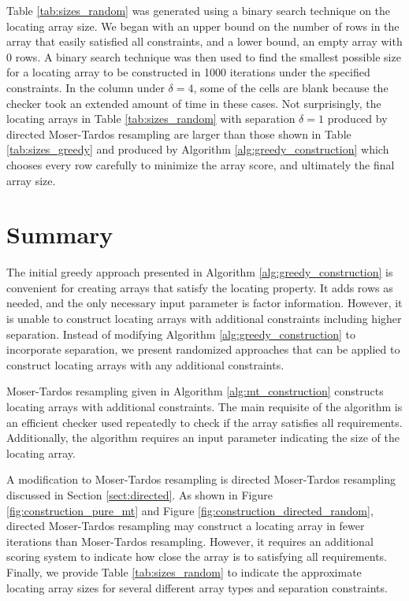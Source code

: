 Table \ref{tab:sizes_random} was generated using a binary search technique on the locating array size.
We began with an upper bound on the number of rows in the array that easily satisfied all constraints, and a lower bound, an empty array with 0 rows.
A binary search technique was then used to find the smallest possible size for a locating array to be constructed in 1000 iterations under the specified constraints.
In the column under $\delta = 4$, some of the cells are blank because the checker took an extended amount of time in these cases.
Not surprisingly, the locating arrays in Table \ref{tab:sizes_random} with separation $\delta = 1$ produced by directed Moser-Tardos resampling are larger than those shown in Table \ref{tab:sizes_greedy} and produced by Algorithm \ref{alg:greedy_construction} which chooses every row carefully to minimize the array score, and ultimately the final array size.

\section{Summary}

The initial greedy approach presented in Algorithm \ref{alg:greedy_construction} is convenient for creating arrays that satisfy the locating property.
It adds rows as needed, and the only necessary input parameter is factor information.
However, it is unable to construct locating arrays with additional constraints including higher separation.
Instead of modifying Algorithm \ref{alg:greedy_construction} to incorporate separation, we present randomized approaches that can be applied to construct locating arrays with any additional constraints.

Moser-Tardos resampling given in Algorithm \ref{alg:mt_construction} constructs locating arrays with additional constraints.
The main requisite of the algorithm is an efficient checker used repeatedly to check if the array satisfies all requirements.
Additionally, the algorithm requires an input parameter indicating the size of the locating array.

A modification to Moser-Tardos resampling is directed Moser-Tardos resampling discussed in Section \ref{sect:directed}.
As shown in Figure \ref{fig:construction_pure_mt} and Figure \ref{fig:construction_directed_random}, directed Moser-Tardos resampling may construct a locating array in fewer iterations than Moser-Tardos resampling.
However, it requires an additional scoring system to indicate how close the array is to satisfying all requirements.
Finally, we provide Table \ref{tab:sizes_random} to indicate the approximate locating array sizes for several different array types and separation constraints.

